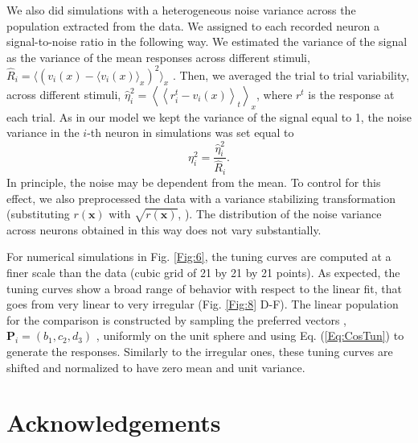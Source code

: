 \documentclass[a4paper]{article}%
\begin{document}
We also did simulations with a heterogeneous noise variance across the
population extracted from the data. We assigned to each recorded neuron a
signal-to-noise ratio in the following way. We estimated the variance of the
signal as the variance of the mean responses across different stimuli,
$\hat{R}_{i} = \langle\left(  v_{i}(x) - \langle v_{i}(x) \rangle_{x} \right)
^{2}\rangle_{x}$ . Then, we averaged the trial to trial variability, across
different stimuli, $\hat{\eta}^{2}_{i} = \left\langle \left\langle r^{t}%
_{i}-v_{i}(x)\right\rangle _{t}\right\rangle _{x}$, where $r^{t}$ is the
response at each trial. As in our model we kept the variance of the signal
equal to 1, the noise variance in the $i$-th neuron in simulations was set
equal to
\begin{equation}
\eta_{i}^{2} = \frac{\hat{\eta}_{i}^{2}}{\hat{R}_{i}}. \label{Eq:snr-data}%
\end{equation}
In principle, the noise may be dependent from the mean. To control for this
effect, we also preprocessed the data with a variance stabilizing
transformation (substituting $r(\mathbf{x}) $ with $\sqrt{r(\mathbf{x})}$,
\cite{SRJ1999TheStatistics}). The distribution of the noise variance across
neurons obtained in this way does not vary substantially.

For numerical simulations in Fig. \ref{Fig:6}, the tuning curves are computed
at a finer scale than the data (cubic grid of 21 by 21 by 21 points). As
expected, the tuning curves show a broad range of behavior with respect to the
linear fit, that goes from very linear to very irregular (Fig. \ref{Fig:8}
D-F). The linear population for the comparison is constructed by sampling the
preferred vectors ,$\mathbf{P}_{i} = (b_{1},c_{2},d_{3})$ , uniformly on the
unit sphere and using Eq. (\ref{Eq:CosTun}) to generate the responses.
Similarly to the irregular ones, these tuning curves are shifted and
normalized to have zero mean and unit variance.

\section{Acknowledgements}



\end{document}
